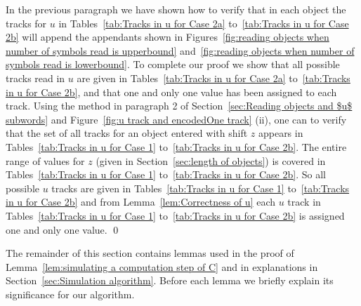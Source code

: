 \documentclass[11pt]{article} \usepackage{amsfonts,amsmath,amssymb,amsthm}
\renewenvironment{proof}{{\bfseries\noindent Proof.}}{\qed\vspace{3.5ex}}
\begin{document}
\begin{proof}
In the previous paragraph we have shown how to verify that in each object the tracks for $u$ in Tables~\ref{tab:Tracks in u for Case 2a} to~\ref{tab:Tracks in u for Case 2b} will append the appendants shown in Figures~\ref{fig:reading objects when number of symbols read is upperbound} and~\ref{fig:reading objects when number of symbols read is lowerbound}. 
To complete our proof we show that all possible tracks read in $u$ are given in Tables~\ref{tab:Tracks in u for Case 2a} to~\ref{tab:Tracks in u for Case 2b}, and that one and only one value has been assigned to each track.
Using the method in paragraph 2 of Section~\ref{sec:Reading objects and $u$ subwords} and Figure~\ref{fig:u track and encodedOne track} (ii),
one can to verify that the set of all tracks for an object entered with shift $z$ appears in Tables~\ref{tab:Tracks in u for Case 1} to~\ref{tab:Tracks in u for Case 2b}.
The entire range of values for $z$ (given in  Section~\ref{sec:length of objects}) is covered in Tables~\ref{tab:Tracks in u for Case 1} to~\ref{tab:Tracks in u for Case 2b}.
So all possible $u$ tracks are given in Tables~\ref{tab:Tracks in u for Case 1} to~\ref{tab:Tracks in u for Case 2b} and from Lemma~\ref{lem:Correctness of u} each $u$ track in Tables~\ref{tab:Tracks in u for Case 1} to~\ref{tab:Tracks in u for Case 2b} is assigned one and only one value. 
\end{proof} 

The remainder of this section contains lemmas used in the proof of 
Lemma~\ref{lem:simulating a computation step of C} and in explanations in Section~\ref{sec:Simulation algorithm}. Before each lemma we briefly explain its significance for our algorithm.
\end{document}
